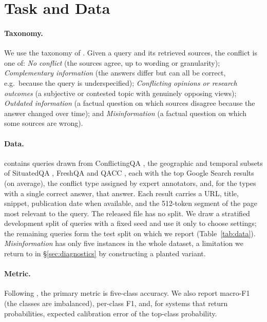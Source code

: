 \section{Task and Data}
\label{sec:task}

\paragraph{Taxonomy.} We use the taxonomy of \citet{cattan2025dragged}. Given a query and its retrieved sources,
the conflict is one of: \emph{No conflict} (the sources agree, up to wording or granularity);
\emph{Complementary information} (the answers differ but can all be correct, e.g.\ because the query is
underspecified); \emph{Conflicting opinions or research outcomes} (a subjective or contested topic with genuinely
opposing views); \emph{Outdated information} (a factual question on which sources disagree because the answer
changed over time); and \emph{Misinformation} (a factual question on which some sources are wrong).

\paragraph{Data.} \conflicts contains \nall queries drawn from ConflictingQA
\citep{wan2024evidence}, the geographic and temporal subsets of SituatedQA \citep{zhang2021situatedqa}, FreshQA
\citep{vu2023freshllms} and QACC \citep{liu2024qacc}, each with the top Google Search results
(\avgresults on average), the conflict type assigned by expert annotators, and, for the types with a single correct
answer, that answer. Each result carries a URL, title, snippet, publication date when available, and the
512-token segment of the page most relevant to the query. The released file has no split. We draw a stratified
development split of \ndev queries with a fixed seed and use it only to choose settings; the remaining \ntest
queries form the test split on which we report (Table~\ref{tab:data}). \emph{Misinformation} has only five
instances in the whole dataset, a limitation we return to in \S\ref{sec:diagnostics} by constructing a planted
variant.



\paragraph{Metric.} Following \citet{cattan2025dragged}, the primary metric is five-class accuracy. We also report
macro-F1 (the classes are imbalanced), per-class F1, and, for systems that return probabilities, expected
calibration error \citep[ECE;][]{guo2017calibration} of the top-class probability.
